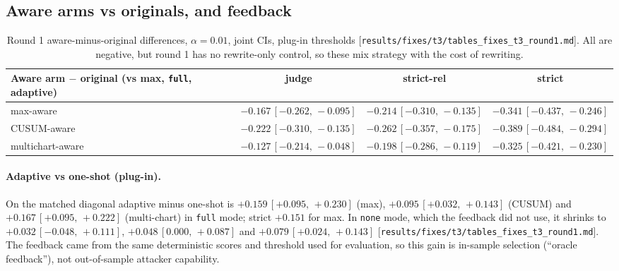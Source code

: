 \documentclass[11pt]{article}
\newcommand{\src}[1]{{\footnotesize\textcolor{ink2}{[\nolinkurl{#1}]}}}
\newcommand{\ci}[2]{\,[#1,\,#2]}
\begin{document}
\subsection{Aware arms vs originals, and feedback}
\begin{table}[H]\centering\small
\begin{adjustbox}{max width=\linewidth}
\begin{tabular}{@{}lccc@{}}
\toprule
Aware arm $-$ original (vs max, \texttt{full}, adaptive) & judge & strict-rel & strict\\
\midrule
max-aware & $-0.167\ci{-0.262}{-0.095}$ & $-0.214\ci{-0.310}{-0.135}$ & $-0.341\ci{-0.437}{-0.246}$\\
CUSUM-aware & $-0.222\ci{-0.310}{-0.135}$ & $-0.262\ci{-0.357}{-0.175}$ & $-0.389\ci{-0.484}{-0.294}$\\
multichart-aware & $-0.127\ci{-0.214}{-0.048}$ & $-0.198\ci{-0.286}{-0.119}$ & $-0.325\ci{-0.421}{-0.230}$\\
\bottomrule
\end{tabular}
\end{adjustbox}
\caption{Round 1 aware-minus-original differences, $\alpha=0.01$, joint CIs, plug-in thresholds \src{results/fixes/t3/tables_fixes_t3_round1.md}. All are negative, but round 1 has no rewrite-only control, so these mix strategy with the cost of rewriting.}
\end{table}

\paragraph{Adaptive vs one-shot (plug-in).} On the matched diagonal adaptive minus one-shot is $+0.159\ci{+0.095}{+0.230}$ (max), $+0.095\ci{+0.032}{+0.143}$ (CUSUM) and $+0.167\ci{+0.095}{+0.222}$ (multi-chart) in \texttt{full} mode; strict $+0.151$ for max. In \texttt{none} mode, which the feedback did not use, it shrinks to $+0.032\ci{-0.048}{+0.111}$, $+0.048\ci{0.000}{+0.087}$ and $+0.079\ci{+0.024}{+0.143}$ \src{results/fixes/t3/tables_fixes_t3_round1.md}. The feedback came from the same deterministic scores and threshold used for evaluation, so this gain is in-sample selection (``oracle feedback''), not out-of-sample attacker capability.
\end{document}
